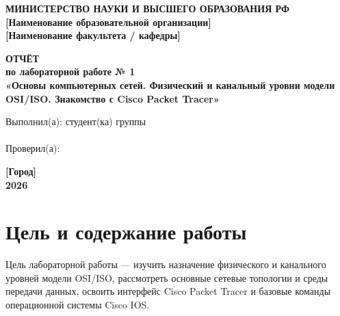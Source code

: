 \documentclass[a4paper,14pt,oneside]{extarticle}
\begin{document}
\renewcommand{\contentsname}{Содержание}
\renewcommand{\figurename}{Рисунок}

\begin{titlepage}
\begin{center}
\textbf{МИНИСТЕРСТВО НАУКИ И ВЫСШЕГО ОБРАЗОВАНИЯ РФ}\\
\vspace{0.4cm}
\textbf{[Наименование образовательной организации]}\\
\textbf{[Наименование факультета / кафедры]}

\vfill

\textbf{\Large ОТЧЁТ}\\
\vspace{0.4cm}
\textbf{\large по лабораторной работе № 1}\\
\vspace{0.4cm}
\textbf{\large «Основы компьютерных сетей. Физический и канальный уровни модели OSI/ISO. Знакомство с Cisco Packet Tracer»}

\vfill

\begin{flushright}
\begin{minipage}{0.48\textwidth}
Выполнил(а): студент(ка) группы \underline{\hspace{3cm}}\\
\underline{\hspace{6cm}}\\
\vspace{0.3cm}
Проверил(а): \underline{\hspace{4cm}}
\end{minipage}
\end{flushright}

\vfill

\textbf{[Город]}\\
\textbf{2026}
\end{center}
\end{titlepage}

\tableofcontents
\newpage

\section{Цель и содержание работы}

Цель лабораторной работы --- изучить назначение физического и канального уровней
модели OSI/ISO, рассмотреть основные сетевые топологии и среды передачи данных,
освоить интерфейс Cisco Packet Tracer и базовые команды операционной системы
Cisco IOS.
\end{document}
